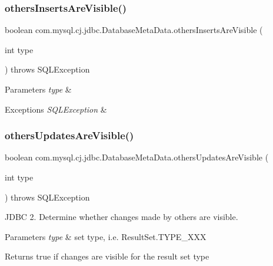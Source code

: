 \subsubsection{\texorpdfstring{others\+Inserts\+Are\+Visible()}{othersInsertsAreVisible()}}
{\footnotesize\ttfamily boolean com.\+mysql.\+cj.\+jdbc.\+Database\+Meta\+Data.\+others\+Inserts\+Are\+Visible (\begin{DoxyParamCaption}\item[{int}]{type }\end{DoxyParamCaption}) throws S\+Q\+L\+Exception}


\begin{DoxyParams}{Parameters}
{\em type} & \\
\hline
\end{DoxyParams}

\begin{DoxyExceptions}{Exceptions}
{\em S\+Q\+L\+Exception} & \\
\hline
\end{DoxyExceptions}
\mbox{\label{classcom_1_1mysql_1_1cj_1_1jdbc_1_1_database_meta_data_ae11c9c0e5cce7a5f68ce7e0fd44060bc}} 
\subsubsection{\texorpdfstring{others\+Updates\+Are\+Visible()}{othersUpdatesAreVisible()}}
{\footnotesize\ttfamily boolean com.\+mysql.\+cj.\+jdbc.\+Database\+Meta\+Data.\+others\+Updates\+Are\+Visible (\begin{DoxyParamCaption}\item[{int}]{type }\end{DoxyParamCaption}) throws S\+Q\+L\+Exception}

J\+D\+BC 2. Determine whether changes made by others are visible.


\begin{DoxyParams}{Parameters}
{\em type} & set type, i.\+e. Result\+Set.\+T\+Y\+P\+E\+\_\+\+X\+XX \\
\hline
\end{DoxyParams}
\begin{DoxyReturn}{Returns}
true if changes are visible for the result set type 
\end{DoxyReturn}

